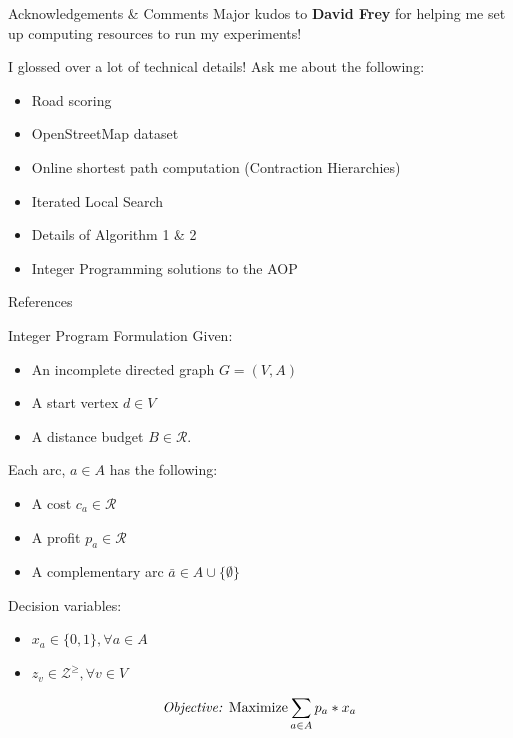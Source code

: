 \documentclass{beamer}
\newcommand{\RR}{\mathcal{R}} %
\newcommand{\ZZ}{\mathcal{Z}} %
\newcommand{\set}[1]{\ensuremath{\{{#1}\}}} %
\begin{document}
\begin{frame}{Acknowledgements \& Comments}
Major kudos to \textbf{David Frey} for helping me set up computing resources to run my experiments! \vspace{0.3cm}

I glossed over a lot of technical details! Ask me about the following:
\begin{itemize}
    \item Road scoring
    \item OpenStreetMap dataset
    \item Online shortest path computation (Contraction Hierarchies)
    \item Iterated Local Search
    \item Details of Algorithm 1 \& 2
    \item Integer Programming solutions to the AOP
\end{itemize}
\end{frame}

\begin{frame}{References}
    \nocite{*}
    \scriptsize
    
    
\end{frame}

\appendix   
\begin{frame}{Integer Program Formulation \cite{verbeeck2014extension}}
Given:
\begin{itemize}
    \item An incomplete directed graph $G = (V,A)$
    \item A start vertex $d \in V$
    \item A distance budget $B \in \RR$.
\end{itemize}
Each arc, $a \in A$ has the following:
\begin{itemize}
    \item A cost $c_a \in \RR$
    \item A profit $p_a \in \RR$
    \item A complementary arc $\bar{a} \in A  \cup \set{\emptyset}$
\end{itemize} 

Decision variables:
\begin{itemize}
    \item $x_a \in \set{0,1},  \forall a \in A$
    \item $z_v \in \ZZ^{\geq}, \forall v \in V$
\end{itemize}
\begin{equation}
    \text{\emph{Objective:} Maximize} \sum_{a \in A}{p_a * x_a}    
\end{equation}
\end{frame}
\end{document}

